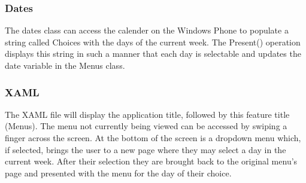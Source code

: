 \documentclass[pdftex,12pt,letter]{article}
\begin{document}
\subsubsection{Dates}
The dates class can access the calender on the Windows Phone to populate a string called Choices with the days of the current week. The Present() operation displays this string in such a manner that each day is selectable and updates the date variable in the Menus class.
\subsubsection{XAML}
The XAML file will display the application title, followed by this feature title
(Menus). The menu not currently being viewed can be accessed by swiping a finger across the screen. At the bottom of the screen is a dropdown menu which, if selected, brings the user to a new page where they may select a day in the current week. After their selection they are brought back to the original menu's page and presented with the menu for the day of their choice.
\end{document}
